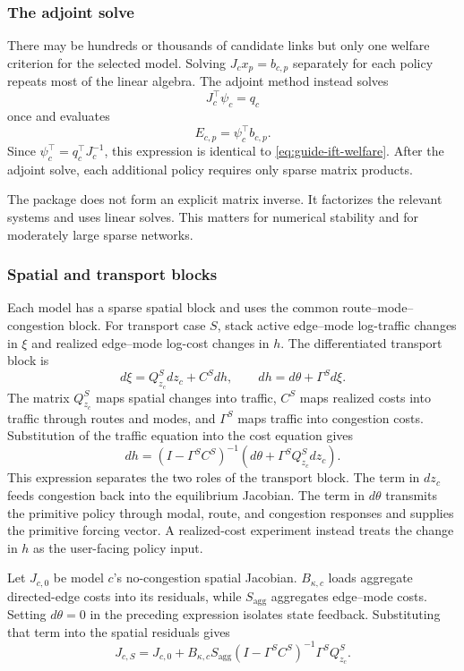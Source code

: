 \subsubsection{The adjoint solve}

There may be hundreds or thousands of candidate links but only one welfare
criterion for the selected model. Solving
\(J_c x_p=b_{c,p}\) separately for each policy repeats most of the linear
algebra. The adjoint method instead solves
\[
 J_c^\top \psi_c=q_c
\]
once and evaluates
\begin{equation}
 E_{c,p}=\psi_c^\top b_{c,p}.
\label{eq:guide-adjoint}
\end{equation}
Since \(\psi_c^\top=q_c^\top J_c^{-1}\), this expression is identical to
\eqref{eq:guide-ift-welfare}. After the adjoint solve, each additional policy
requires only sparse matrix products.

The package does not form an explicit matrix inverse. It factorizes the
relevant systems and uses linear solves. This matters for numerical stability
and for moderately large sparse networks.

\subsubsection{Spatial and transport blocks}

Each model has a sparse spatial block and uses the common
route--mode--congestion block. For transport case \(S\), stack active
edge--mode log-traffic changes in \(\xi\) and realized edge--mode log-cost
changes in \(h\). The differentiated transport block is
\[
 d\xi=Q_{z_c}^S dz_c+C^Sdh,\qquad
 dh=d\theta+\Gamma^S d\xi.
\]
The matrix \(Q_{z_c}^S\) maps spatial changes into traffic, \(C^S\) maps
realized costs into traffic through routes and modes, and \(\Gamma^S\) maps
traffic into congestion costs. Substitution of the traffic equation into the
cost equation gives
\[
 dh=(I-\Gamma^SC^S)^{-1}
 \left(d\theta+\Gamma^SQ_{z_c}^S dz_c\right).
\]
This expression separates the two roles of the transport block. The term in
\(dz_c\) feeds congestion back into the equilibrium Jacobian. The term in
\(d\theta\) transmits the primitive policy through modal, route, and
congestion responses and supplies the primitive forcing vector. A
realized-cost experiment instead treats the change in \(h\) as the
user-facing policy input.

Let \(J_{c,0}\) be model \(c\)'s no-congestion spatial Jacobian.
\(B_{\kappa,c}\) loads aggregate directed-edge costs into its residuals, while
\(S_{\mathrm{agg}}\) aggregates edge--mode costs. Setting \(d\theta=0\) in
the preceding expression isolates state feedback. Substituting that term into
the spatial residuals gives
\begin{equation}
 J_{c,S}
 =J_{c,0}+B_{\kappa,c}S_{\mathrm{agg}}
 (I-\Gamma^SC^S)^{-1}
 \Gamma^SQ_{z_c}^S.
\label{eq:guide-reduced-jacobian}
\end{equation}

